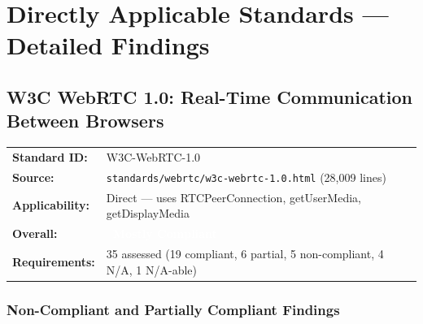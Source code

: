 \documentclass[11pt,letterpaper]{article}
\newcommand{\mostlycompliant}{\colorbox{partial}{\textcolor{white}{\textbf{\small~Mostly Compliant~}}}}
\begin{document}
\newpage

\section{Directly Applicable Standards --- Detailed Findings}

\subsection{W3C WebRTC 1.0: Real-Time Communication Between Browsers}

\begin{tabular}{ll}
\textbf{Standard ID:} & W3C-WebRTC-1.0 \\
\textbf{Source:} & \texttt{standards/webrtc/w3c-webrtc-1.0.html} (28,009 lines) \\
\textbf{Applicability:} & Direct --- uses RTCPeerConnection, getUserMedia, getDisplayMedia \\
\textbf{Overall:} & \mostlycompliant \\
\textbf{Requirements:} & 35 assessed (19 compliant, 6 partial, 5 non-compliant, 4 N/A, 1 N/A-able) \\
\end{tabular}

\subsubsection{Non-Compliant and Partially Compliant Findings}
\end{document}

